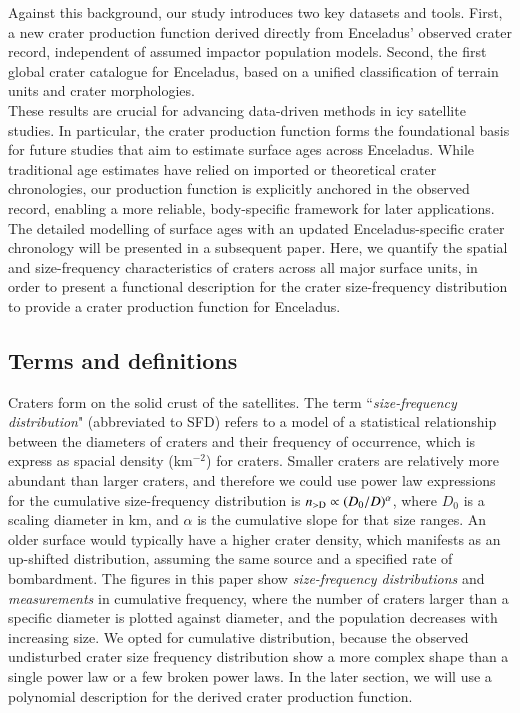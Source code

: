 \documentclass[preprint,11pt,3p,times,authoryear]{elsarticle}
\begin{document}
Against this background, our study introduces two key datasets and tools. First, a new crater production function derived directly from Enceladus’ observed crater record, independent of assumed impactor population models. Second, the first global crater catalogue for Enceladus, based on a unified classification of terrain units and crater morphologies. \\

These results are crucial for advancing data-driven methods in icy satellite studies. In particular, the crater production function forms the foundational basis for future studies that aim to estimate surface ages across Enceladus. While traditional age estimates have relied on imported or theoretical crater chronologies, our production function is explicitly anchored in the observed record, enabling a more reliable, body-specific framework for later applications. \\

The detailed modelling of surface ages with an updated Enceladus-specific crater chronology will be presented in a subsequent paper. Here, we quantify the spatial and size-frequency characteristics of craters across all major surface units, in order to present a functional description for the crater size-frequency distribution to provide a crater production function for Enceladus.

\subsection{Terms and definitions}
\label{term&def}
Craters form on the solid crust of the satellites. The term
``{\it size-frequency distribution}" (abbreviated to SFD) refers to a model of a statistical relationship between the diameters of craters and their frequency of occurrence, which is express as spacial density (km$^{-2}$) for craters.
Smaller craters are relatively more abundant than larger craters, and therefore we could use power law expressions for the cumulative size-frequency distribution is $n_{\rm >D} \propto (D_0/D)^\alpha$, %
where $D_0$ is a scaling diameter in km, and $\alpha$ is the cumulative slope for that size ranges.
An older surface would typically have a higher crater density, which manifests as an up-shifted distribution, assuming the same source and a specified rate of bombardment.
The figures in this paper show {\it size-frequency distributions} and {\it measurements} in cumulative frequency, where the number of craters larger than a specific diameter is plotted against diameter, and the population decreases with increasing size.
We opted for cumulative distribution, because the observed undisturbed crater size frequency distribution show a more complex shape than a single power law or a few broken power laws. In the later section, we will use a polynomial description for the derived crater production function.\\
\end{document}
